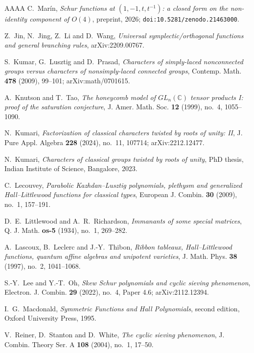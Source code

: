 \documentclass[11pt,reqno]{amsart}
\theoremstyle{plain}
\theoremstyle{definition}
\newcommand{\CC}{\mathbb{C}}
\begin{document}
\begin{thebibliography}{AAAA}
 C.~Mar\'in, \emph{Schur functions at $(1,-1,t,t^{-1})$: a closed form on the
non-identity component of $O(4)$}, preprint, 2026; \texttt{doi:10.5281/zenodo.21463000}.

 Z.~Jin, N.~Jing, Z.~Li and D.~Wang, \emph{Universal symplectic/orthogonal
functions and general branching rules}, arXiv:2209.00767.

 S.~Kumar, G.~Lusztig and D.~Prasad, \emph{Characters of simply-laced
nonconnected groups versus characters of nonsimply-laced connected groups}, Contemp. Math.
\textbf{478} (2009), 99--101; arXiv:math/0701615.

 A.~Knutson and T.~Tao, \emph{The honeycomb model of $GL_n(\CC)$ tensor
products I: proof of the saturation conjecture}, J. Amer. Math. Soc. \textbf{12} (1999), no.~4,
1055--1090.

 N.~Kumari, \emph{Factorization of classical characters twisted by roots of
unity: II}, J. Pure Appl. Algebra \textbf{228} (2024), no.~11, 107714; arXiv:2212.12477.

 N.~Kumari, \emph{Characters of classical groups twisted by roots of
unity}, PhD thesis, Indian Institute of Science, Bangalore, 2023.

 C.~Lecouvey, \emph{Parabolic Kazhdan--Lusztig polynomials, plethysm and
generalized Hall--Littlewood functions for classical types}, European J. Combin. \textbf{30} (2009),
no.~1, 157--191.

 D.~E.~Littlewood and A.~R.~Richardson, \emph{Immanants of some special
matrices}, Q. J. Math. \textbf{os-5} (1934), no.~1, 269--282.

 A.~Lascoux, B.~Leclerc and J.-Y.~Thibon, \emph{Ribbon tableaux,
Hall--Littlewood functions, quantum affine algebras and unipotent varieties}, J. Math. Phys.
\textbf{38} (1997), no.~2, 1041--1068.

 S.-Y.~Lee and Y.-T.~Oh, \emph{Skew Schur polynomials and cyclic sieving
phenomenon}, Electron. J. Combin. \textbf{29} (2022), no.~4, Paper 4.6; arXiv:2112.12394.

 I.~G.~Macdonald, \emph{Symmetric Functions and Hall Polynomials}, second
edition, Oxford University Press, 1995.

 V.~Reiner, D.~Stanton and D.~White, \emph{The cyclic sieving phenomenon},
J. Combin. Theory Ser. A \textbf{108} (2004), no.~1, 17--50.


\end{thebibliography}
\end{document}

